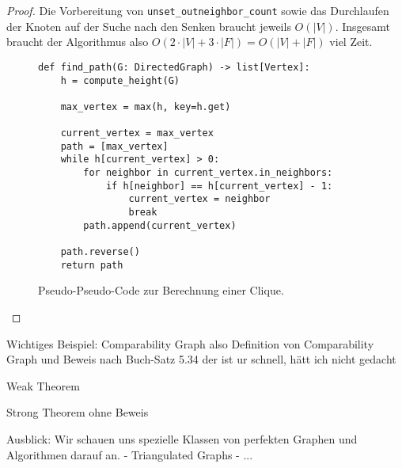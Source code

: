 \documentclass[../main.tex]{subfiles}
\begin{document}
\begin{proof}
    Die Vorbereitung von \verb|unset_outneighbor_count| sowie das Durchlaufen der Knoten auf der Suche nach den Senken braucht jeweils $O(|V|)$. Insgesamt braucht der Algorithmus also $O(2\cdot|V| + 3\cdot|F|) = O(|V| + |F|)$ viel Zeit.

    \begin{figure}[ht]
        \label{algo:clique}
        \centering
        \begin{verbatim}
def find_path(G: DirectedGraph) -> list[Vertex]:
    h = compute_height(G)

    max_vertex = max(h, key=h.get)
    
    current_vertex = max_vertex
    path = [max_vertex]
    while h[current_vertex] > 0:
        for neighbor in current_vertex.in_neighbors:
            if h[neighbor] == h[current_vertex] - 1:
                current_vertex = neighbor
                break
        path.append(current_vertex)

    path.reverse()
    return path
        \end{verbatim}
        \caption{Pseudo-Pseudo-Code zur Berechnung einer Clique.}
    \end{figure}

\end{proof}
    
    
    
    
    Wichtiges Beispiel: Comparability Graph
    also Definition von Comparability Graph
    und Beweis nach Buch-Satz 5.34
    der ist ur schnell, hätt ich nicht gedacht 

Weak Theorem

Strong Theorem ohne Beweis


Ausblick:
    Wir schauen uns spezielle Klassen von perfekten Graphen und Algorithmen darauf an.
        - Triangulated Graphs
        - ...
\end{document}
